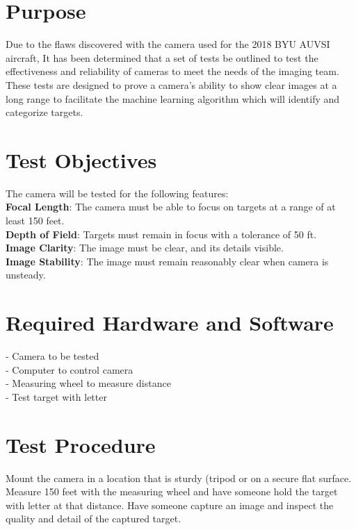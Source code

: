 \documentclass[]{auvsi_doc}
\begin{document}
\begin{AUVSITitlePage}
\begin{artifacttable}
\end{artifacttable}
\end{AUVSITitlePage}

\section{Purpose}

Due to the flaws discovered with the camera used for the 2018 BYU AUVSI aircraft, It has been determined that a set of tests be outlined to test the effectiveness and reliability of cameras to meet the needs of the imaging team. These tests are designed to prove a camera’s ability to show clear images at a long range to facilitate the machine learning algorithm which will identify and categorize targets.

\section{Test Objectives}

The camera will be tested for the following features:\\
\textbf{Focal Length}: The camera must be able to focus on targets at a range of at least 150 feet.\\
\textbf{Depth of Field}: Targets must remain in focus with a tolerance of 50 ft.\\
\textbf{Image Clarity}: The image must be clear, and its details visible.\\
\textbf{Image Stability}: The image must remain reasonably clear when camera is unsteady.\\


\section{Required Hardware and Software}

- Camera to be tested\\
- Computer to control camera\\
- Measuring wheel to measure distance\\
- Test target with letter

\section{Test Procedure}
Mount the camera in a location that is sturdy (tripod or on a secure flat surface. Measure 150 feet with the measuring wheel and have someone hold the target with letter at that distance. Have someone capture an image and inspect the quality and detail of the captured target.
\end{document}
